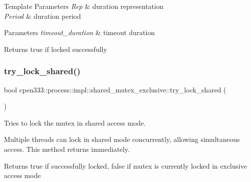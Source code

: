 \begin{DoxyTemplParams}{Template Parameters}
{\em Rep} & duration representation \\
\hline
{\em Period} & duration period \\
\hline
\end{DoxyTemplParams}

\begin{DoxyParams}{Parameters}
{\em timeout\+\_\+duration} & timeout duration \\
\hline
\end{DoxyParams}
\begin{DoxyReturn}{Returns}
true if locked successfully 
\end{DoxyReturn}
\mbox{\label{classcpen333_1_1process_1_1impl_1_1shared__mutex__exclusive_a0e2e6a0afb83c06d70ceca86e591732f}} 
\subsubsection{\texorpdfstring{try\+\_\+lock\+\_\+shared()}{try\_lock\_shared()}}
{\footnotesize\ttfamily bool cpen333\+::process\+::impl\+::shared\+\_\+mutex\+\_\+exclusive\+::try\+\_\+lock\+\_\+shared (\begin{DoxyParamCaption}{ }\end{DoxyParamCaption})\hspace{0.3cm}{\ttfamily [inline]}}



Tries to lock the mutex in shared access mode. 

Multiple threads can lock in shared mode concurrently, allowing simultaneous access. This method returns immediately.

\begin{DoxyReturn}{Returns}
true if successfully locked, false if mutex is currently locked in exclusive access mode 
\end{DoxyReturn}
\mbox{\label{classcpen333_1_1process_1_1impl_1_1shared__mutex__exclusive_a655b0bf8c84c6711e2120540d1c77c04}} 
